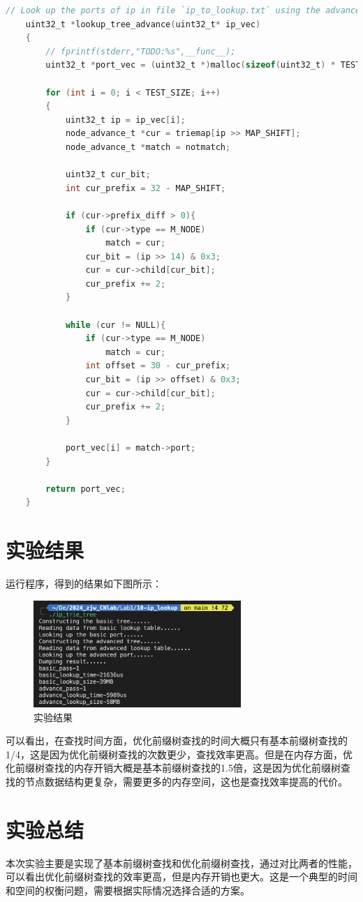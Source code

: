 \documentclass[UTF8]{report}
\begin{document}
\begin{lstlisting}[language=C]
    // Look up the ports of ip in file `ip_to_lookup.txt` using the advanced tree input is read from `read_test_data` func 
    uint32_t *lookup_tree_advance(uint32_t* ip_vec)
    {
        // fprintf(stderr,"TODO:%s",__func__);
        uint32_t *port_vec = (uint32_t *)malloc(sizeof(uint32_t) * TEST_SIZE);
    
        for (int i = 0; i < TEST_SIZE; i++)
        {
            uint32_t ip = ip_vec[i];
            node_advance_t *cur = triemap[ip >> MAP_SHIFT];
            node_advance_t *match = notmatch;
    
            uint32_t cur_bit;
            int cur_prefix = 32 - MAP_SHIFT;
    
            if (cur->prefix_diff > 0){
                if (cur->type == M_NODE)
                    match = cur;
                cur_bit = (ip >> 14) & 0x3;
                cur = cur->child[cur_bit];
                cur_prefix += 2;
            }
    
            while (cur != NULL){
                if (cur->type == M_NODE)
                    match = cur;
                int offset = 30 - cur_prefix;
                cur_bit = (ip >> offset) & 0x3;
                cur = cur->child[cur_bit];
                cur_prefix += 2;
            }
    
            port_vec[i] = match->port;
        }   
            
        return port_vec;
    }    
\end{lstlisting}

\section{实验结果}

运行程序，得到的结果如下图所示：

\begin{figure}[H]
    \centering
    \includegraphics[width=0.7\textwidth]{result.png}
    \caption{实验结果}
\end{figure}

可以看出，在查找时间方面，优化前缀树查找的时间大概只有基本前缀树查找的1/4，这是因为优化前缀树查找的次数更少，查找效率更高。但是在内存方面，优化前缀树查找的内存开销大概是基本前缀树查找的1.5倍，这是因为优化前缀树查找的节点数据结构更复杂，需要更多的内存空间，这也是查找效率提高的代价。

\section{实验总结}

本次实验主要是实现了基本前缀树查找和优化前缀树查找，通过对比两者的性能，可以看出优化前缀树查找的效率更高，但是内存开销也更大。这是一个典型的时间和空间的权衡问题，需要根据实际情况选择合适的方案。
\end{document}
